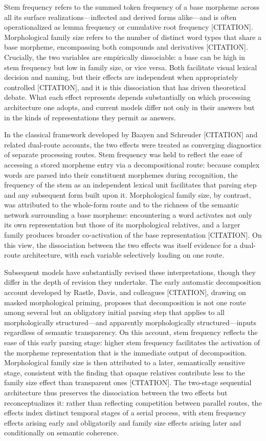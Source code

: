 \documentclass[utf8]{FrontiersinHarvard} %
\begin{document}
Stem frequency refers to the summed token frequency of a base morpheme across all its surface realizations—inflected and derived forms alike—and is often operationalized as lemma frequency or cumulative root frequency [CITATION]. Morphological family size refers to the number of distinct word types that share a base morpheme, encompassing both compounds and derivatives [CITATION]. Crucially, the two variables are empirically dissociable: a base can be high in stem frequency but low in family size, or vice versa. Both facilitate visual lexical decision and naming, but their effects are independent when appropriately controlled [CITATION], and it is this dissociation that has driven theoretical debate. What each effect represents depends substantially on which processing architecture one adopts, and current models differ not only in their answers but in the kinds of representations they permit as answers.

In the classical framework developed by Baayen and Schreuder [CITATION] and related dual-route accounts, the two effects were treated as converging diagnostics of separate processing routes. Stem frequency was held to reflect the ease of accessing a stored morpheme entry via a decompositional route: because complex words are parsed into their constituent morphemes during recognition, the frequency of the stem as an independent lexical unit facilitates that parsing step and any subsequent form built upon it. Morphological family size, by contrast, was attributed to the whole-form route and to the richness of the semantic network surrounding a base morpheme: encountering a word activates not only its own representation but those of its morphological relatives, and a larger family produces broader co-activation of the base representation [CITATION]. On this view, the dissociation between the two effects was itself evidence for a dual-route architecture, with each variable selectively loading on one route.

Subsequent models have substantially revised these interpretations, though they differ in the depth of revision they undertake. The early automatic decomposition account developed by Rastle, Davis, and colleagues [CITATION], drawing on masked morphological priming, proposes that decomposition is not one route among several but an obligatory initial parsing step that applies to all morphologically structured—and apparently morphologically structured—inputs regardless of semantic transparency. On this account, stem frequency reflects the ease of this early parsing stage: higher stem frequency facilitates the activation of the morpheme representation that is the immediate output of decomposition. Morphological family size is then attributed to a later, semantically sensitive stage, consistent with the finding that opaque relatives contribute less to the family size effect than transparent ones [CITATION]. The two-stage sequential architecture thus preserves the dissociation between the two effects but reconceptualizes it: rather than reflecting competition between parallel routes, the effects index distinct temporal stages of a serial process, with stem frequency effects arising early and obligatorily and family size effects arising later and conditionally on semantic coherence.
\end{document}
